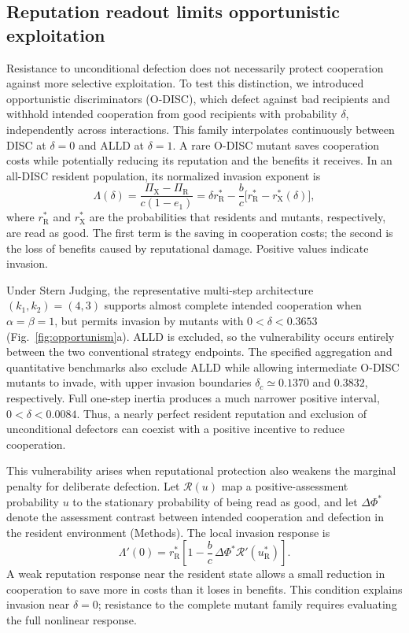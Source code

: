 \documentclass[fleqn,10pt]{article}
\begin{document}
\subsection*{Reputation readout limits opportunistic exploitation}

Resistance to unconditional defection does not necessarily protect cooperation against more selective exploitation. To test this distinction, we introduced opportunistic discriminators (O-DISC), which defect against bad recipients and withhold intended cooperation from good recipients with probability $\delta$, independently across interactions. This family interpolates continuously between DISC at $\delta=0$ and ALLD at $\delta=1$. A rare O-DISC mutant saves cooperation costs while potentially reducing its reputation and the benefits it receives. In an all-DISC resident population, its normalized invasion exponent is
\begin{equation}
\Lambda(\delta)
=\frac{\Pi_{\mathrm X}-\Pi_{\mathrm R}}{c(1-e_1)}
=\delta r_{\mathrm R}^*
-\frac{b}{c}\bigl[r_{\mathrm R}^*-r_{\mathrm X}^*(\delta)\bigr],
\label{eq:opportunistic-invasion-results}
\end{equation}
where $r_{\mathrm R}^*$ and $r_{\mathrm X}^*$ are the probabilities that residents and mutants, respectively, are read as good. The first term is the saving in cooperation costs; the second is the loss of benefits caused by reputational damage. Positive values indicate invasion.

Under Stern Judging, the representative multi-step architecture $(k_1,k_2)=(4,3)$ supports almost complete intended cooperation when $\alpha=\beta=1$, but permits invasion by mutants with $0<\delta<0.3653$ (Fig.~\ref{fig:opportunism}a). ALLD is excluded, so the vulnerability occurs entirely between the two conventional strategy endpoints. The specified aggregation and quantitative benchmarks also exclude ALLD while allowing intermediate O-DISC mutants to invade, with upper invasion boundaries $\delta_c\simeq0.1370$ and $0.3832$, respectively. Full one-step inertia produces a much narrower positive interval, $0<\delta<0.0084$. Thus, a nearly perfect resident reputation and exclusion of unconditional defectors can coexist with a positive incentive to reduce cooperation.

This vulnerability arises when reputational protection also weakens the marginal penalty for deliberate defection. Let $\mathcal R(u)$ map a positive-assessment probability $u$ to the stationary probability of being read as good, and let $\Delta\Phi^*$ denote the assessment contrast between intended cooperation and defection in the resident environment (Methods). The local invasion response is
\begin{equation}
\Lambda'(0)
=r_{\mathrm R}^*\left[1-\frac{b}{c}\,\Delta\Phi^* \mathcal R'(u_{\mathrm R}^*)\right].
\label{eq:opportunistic-slope-results}
\end{equation}
A weak reputation response near the resident state allows a small reduction in cooperation to save more in costs than it loses in benefits. This condition explains invasion near $\delta=0$; resistance to the complete mutant family requires evaluating the full nonlinear response.
\end{document}
